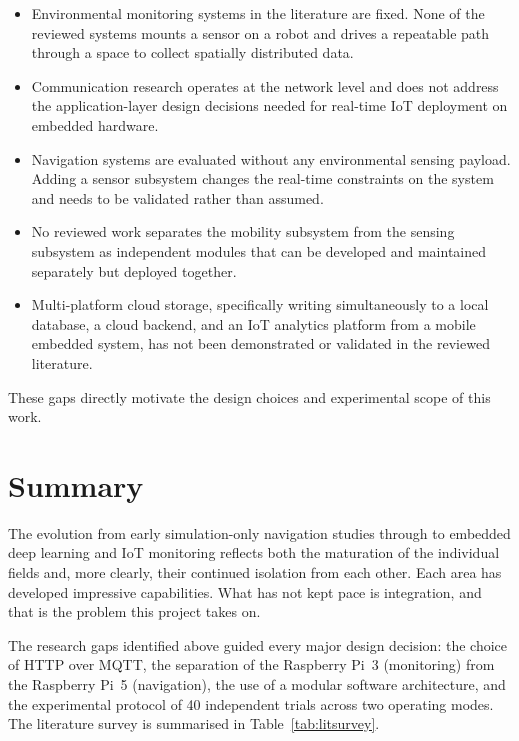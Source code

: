 \begin{itemize}
    \item Environmental monitoring systems in the literature are fixed.
          None of the reviewed systems mounts a sensor on a robot and
          drives a repeatable path through a space to collect spatially
          distributed data.
    \item Communication research operates at the network level and does
          not address the application-layer design decisions needed for
          real-time IoT deployment on embedded hardware.
    \item Navigation systems are evaluated without any environmental
          sensing payload. Adding a sensor subsystem changes the
          real-time constraints on the system and needs to be validated
          rather than assumed.
    \item No reviewed work separates the mobility subsystem from the
          sensing subsystem as independent modules that can be developed
          and maintained separately but deployed together.
    \item Multi-platform cloud storage, specifically writing simultaneously to a
          local database, a cloud backend, and an IoT analytics platform
          from a mobile embedded system, has not been demonstrated or
          validated in the reviewed literature.
\end{itemize}

These gaps directly motivate the design choices and experimental scope
of this work.

\section{Summary}

The evolution from early simulation-only navigation studies through to
embedded deep learning and IoT monitoring reflects both the maturation
of the individual fields and, more clearly, their continued isolation
from each other. Each area has developed impressive capabilities. What
has not kept pace is integration, and that is the problem this project
takes on.

The research gaps identified above guided every major design decision:
the choice of HTTP over MQTT, the separation of the Raspberry Pi~3
(monitoring) from the Raspberry Pi~5 (navigation), the use of a modular
software architecture, and the experimental protocol of 40 independent
trials across two operating modes. The literature survey is summarised
in Table~\ref{tab:litsurvey}.

